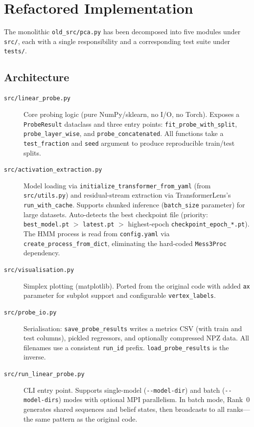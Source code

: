 \documentclass[11pt]{article}
\newcommand{\code}[1]{\texttt{#1}}
\newcommand{\file}[1]{\texttt{#1}}
\begin{document}
\section{Refactored Implementation}

The monolithic \file{old\_src/pca.py} has been decomposed into five modules under \file{src/}, each with a single responsibility and a corresponding test suite under \file{tests/}.

\subsection{Architecture}

\begin{description}
  \item[\file{src/linear\_probe.py}] Core probing logic (pure NumPy/sklearn, no I/O, no Torch).  Exposes a \code{ProbeResult} dataclass and three entry points: \code{fit\_probe\_with\_split}, \code{probe\_layer\_wise}, and \code{probe\_concatenated}.  All functions take a \code{test\_fraction} and \code{seed} argument to produce reproducible train/test splits.

  \item[\file{src/activation\_extraction.py}] Model loading via \code{initialize\_transformer\_from\_yaml} (from \file{src/utils.py}) and residual-stream extraction via TransformerLens's \code{run\_with\_cache}.  Supports chunked inference (\code{batch\_size} parameter) for large datasets.  Auto-detects the best checkpoint file (priority: \file{best\_model.pt} $>$ \file{latest.pt} $>$ highest-epoch \file{checkpoint\_epoch\_*.pt}).  The HMM process is read from \file{config.yaml} via \code{create\_process\_from\_dict}, eliminating the hard-coded \code{Mess3Proc} dependency.

  \item[\file{src/visualisation.py}] Simplex plotting (matplotlib).  Ported from the original code with added \code{ax} parameter for subplot support and configurable \code{vertex\_labels}.

  \item[\file{src/probe\_io.py}] Serialisation: \code{save\_probe\_results} writes a metrics CSV (with train and test columns), pickled regressors, and optionally compressed NPZ data.  All filenames use a consistent \code{run\_id} prefix.  \code{load\_probe\_results} is the inverse.

  \item[\file{src/run\_linear\_probe.py}] CLI entry point.  Supports single-model (\code{-{}-model-dir}) and batch (\code{-{}-model-dirs}) modes with optional MPI parallelism.  In batch mode, Rank~0 generates shared sequences and belief states, then broadcasts to all ranks---the same pattern as the original code.
\end{description}
\end{document}
